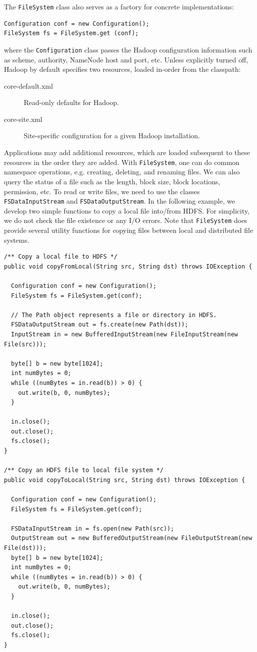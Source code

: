 \documentclass[12pt]{book}
\begin{document}
The \texttt{FileSystem} class also serves as a factory for concrete implementations:
\begin{lstlisting}
Configuration conf = new Configuration();
FileSystem fs = FileSystem.get (conf);
\end{lstlisting}
where the \texttt{Configuration} class passes the Hadoop configuration information such as scheme, authority, NameNode host and port, etc. Unless explicitly turned off, Hadoop by default specifies two resources, loaded in-order from the classpath:
\begin{description}
\item[core-default.xml] Read-only defaults for Hadoop.
\item[core-site.xml] Site-specific configuration for a given Hadoop installation.
\end{description}
Applications may add additional resources, which are loaded subsequent to these resources in the order they are added. With \texttt{FileSystem}, one can do common namespace operations, e.g. creating, deleting, and renaming files. We can also query the status of a file such as the length, block size, block locations, permission, etc. To read or write files, we need to use the classes \texttt{FSDataInputStream} and \texttt{FSDataOutputStream}. In the following example, we develop two simple functions to copy a local file into/from HDFS. For simplicity, we do not check the file existence or any I/O errors. Note that \texttt{FileSystem} does provide several utility functions for copying files between local and distributed file systems.

\begin{lstlisting}
/** Copy a local file to HDFS */
public void copyFromLocal(String src, String dst) throws IOException {
 
  Configuration conf = new Configuration();
  FileSystem fs = FileSystem.get(conf);
  
  // The Path object represents a file or directory in HDFS.
  FSDataOutputStream out = fs.create(new Path(dst));
  InputStream in = new BufferedInputStream(new FileInputStream(new File(src)));
 
  byte[] b = new byte[1024];
  int numBytes = 0;
  while ((numBytes = in.read(b)) > 0) {
    out.write(b, 0, numBytes);
  }
 
  in.close();
  out.close();
  fs.close();
}

/** Copy an HDFS file to local file system */
public void copyToLocal(String src, String dst) throws IOException {
 
  Configuration conf = new Configuration();
  FileSystem fs = FileSystem.get(conf);
 
  FSDataInputStream in = fs.open(new Path(src));
  OutputStream out = new BufferedOutputStream(new FileOutputStream(new File(dst)));
  byte[] b = new byte[1024];
  int numBytes = 0;
  while ((numBytes = in.read(b)) > 0) {
    out.write(b, 0, numBytes);
  }
 
  in.close();
  out.close();
  fs.close();
}
\end{lstlisting}
\end{document}
